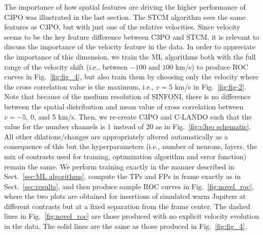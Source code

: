 \documentclass{aa}
\begin{document}
The importance of how spatial features are driving the higher performance of C3PO was illustrated in the last section. The STCM algorithm sees the same features as C3PO, but with just one of the relative velocities.
Since velocity seems to be the key feature difference between C3PO and STCM, it is relevant to discuss the importance of the velocity feature in the data. 
In order to appreciate the importance of this dimension, we train the ML algorithms both with the full range of the velocity shift (i.e., between $-100$ and $100$ km/s) to produce ROC curves in Fig.~\ref{fig:fig_4}, but also train them by choosing only the velocity where the cross correlation value is the maximum, i.e., $v=5$ km/s in Fig.~\ref{fig:fig-2}.
Note that because of the medium resolution of SINFONI, there is no difference between the spatial distribution and mean value of cross correlation between $v=-5$, 0, and 5 km/s. 
Then, we re-create C3PO and C-LANDO such that the value for the number channels is $1$ instead of $20$ as in Fig.~\ref{fig:c3po schematic}.
All other dilations/changes are appropriately altered automatically as a consequence of this but the hyperparameters (i.e., number of neurons, layers, the mix of contrasts used for training, optimization algorithm and error function) remain the same.
We perform training exactly in the manner described in Sect.~\ref{sec:ML algorithms}, compute the TPs and FPs in frame exactly as in Sect.~\ref{sec:results}, and then produce sample ROC curves in Fig.~\ref{fig:novel_roc}, where the two plots are obtained for insertions of simulated warm Jupiters at different contrasts but at a fixed separation from the frame center.
The dashed lines in Fig.~\ref{fig:novel_roc} are those produced with no explicit velocity evolution in the data.
The solid lines are the same as those produced in Fig.~\ref{fig:fig_4}.
\end{document}
